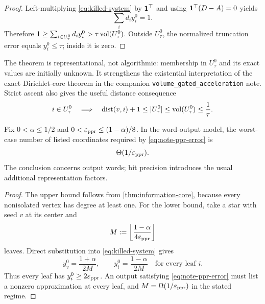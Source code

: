\begin{proof}
Left-multiplying \cref{eq:killed-system} by $\mathbf{1}^\top$ and using
$\mathbf{1}^\top(D-A)=0$ yields
\begin{equation}
 \sum_i d_i y_i^0=1.
 \label{eq:normalized-mass}
\end{equation}
Therefore
$1\geq\sum_{i\in U_\tau^0}d_i y_i^0
>\tau\operatorname{vol}(U_\tau^0)$.
Outside $U_\tau^0$, the normalized truncation error equals $y_i^0\leq\tau$;
inside it is zero.
\end{proof}

The theorem is representational, not algorithmic: membership in
$U_\tau^0$ and its exact values are initially unknown.  It strengthens the
existential interpretation of the exact Dirichlet-core theorem in the
companion \texttt{volume\_gated\_acceleration} note.  Strict ascent also gives
the useful distance consequence
\begin{equation}
 i\in U_\tau^0
 \quad\Longrightarrow\quad
 \operatorname{dist}(v,i)+1
 \leq |U_\tau^0|
 \leq\operatorname{vol}(U_\tau^0)
 \leq\frac1\tau.
 \label{eq:significant-distance}
\end{equation}

\begin{theorem}
\label{thm:output-tight}
Fix $0<\alpha\leq1/2$ and
$0<\varepsilon_{\mathrm{ppr}}\leq(1-\alpha)/8$.  In the word-output model, the worst-case
number of listed coordinates required by \cref{eq:note-ppr-error} is
\begin{equation}
 \Theta(1/\varepsilon_{\mathrm{ppr}}).
 \label{eq:output-theta}
\end{equation}
The conclusion concerns output words; bit precision introduces the usual
additional representation factors.
\end{theorem}

\begin{proof}
The upper bound follows from \cref{thm:information-core}, because every
nonisolated vertex has degree at least one.  For the lower bound, take a star
with seed $v$ at its center and
\[
 M:=\left\lfloor\frac{1-\alpha}{4\varepsilon_{\mathrm{ppr}}}\right\rfloor
\]
leaves.  Direct substitution into \cref{eq:killed-system} gives
\begin{equation}
 y_v^0=\frac{1+\alpha}{2M},
 \qquad
 y_i^0=\frac{1-\alpha}{2M}
 \quad\text{for every leaf }i.
 \label{eq:star-normalized-values}
\end{equation}
Thus every leaf has $y_i^0\geq2\varepsilon_{\mathrm{ppr}}$.  An output satisfying
\cref{eq:note-ppr-error} must list a nonzero approximation at every leaf, and
$M=\Omega(1/\varepsilon_{\mathrm{ppr}})$ in the stated regime.
\end{proof}

